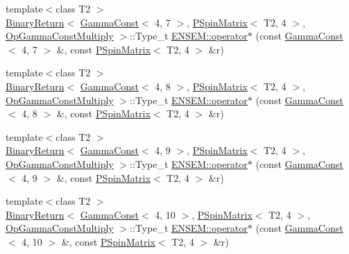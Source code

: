 \begin{DoxyCompactItemize}
\item 
{\footnotesize template$<$class T2 $>$ }\\\mbox{\hyperlink{structENSEM_1_1BinaryReturn}{Binary\+Return}}$<$ \mbox{\hyperlink{classENSEM_1_1GammaConst}{Gamma\+Const}}$<$ 4, 7 $>$, \mbox{\hyperlink{classENSEM_1_1PSpinMatrix}{P\+Spin\+Matrix}}$<$ T2, 4 $>$, \mbox{\hyperlink{structENSEM_1_1OpGammaConstMultiply}{Op\+Gamma\+Const\+Multiply}} $>$\+::Type\+\_\+t \mbox{\hyperlink{group__primspinmatrix_ga05f36a58daa404d7245006a9dd7323bb}{E\+N\+S\+E\+M\+::operator$\ast$}} (const \mbox{\hyperlink{classENSEM_1_1GammaConst}{Gamma\+Const}}$<$ 4, 7 $>$ \&, const \mbox{\hyperlink{classENSEM_1_1PSpinMatrix}{P\+Spin\+Matrix}}$<$ T2, 4 $>$ \&r)
\item 
{\footnotesize template$<$class T2 $>$ }\\\mbox{\hyperlink{structENSEM_1_1BinaryReturn}{Binary\+Return}}$<$ \mbox{\hyperlink{classENSEM_1_1GammaConst}{Gamma\+Const}}$<$ 4, 8 $>$, \mbox{\hyperlink{classENSEM_1_1PSpinMatrix}{P\+Spin\+Matrix}}$<$ T2, 4 $>$, \mbox{\hyperlink{structENSEM_1_1OpGammaConstMultiply}{Op\+Gamma\+Const\+Multiply}} $>$\+::Type\+\_\+t \mbox{\hyperlink{group__primspinmatrix_ga14cbf328548b8d7ab484cf88d9190adf}{E\+N\+S\+E\+M\+::operator$\ast$}} (const \mbox{\hyperlink{classENSEM_1_1GammaConst}{Gamma\+Const}}$<$ 4, 8 $>$ \&, const \mbox{\hyperlink{classENSEM_1_1PSpinMatrix}{P\+Spin\+Matrix}}$<$ T2, 4 $>$ \&r)
\item 
{\footnotesize template$<$class T2 $>$ }\\\mbox{\hyperlink{structENSEM_1_1BinaryReturn}{Binary\+Return}}$<$ \mbox{\hyperlink{classENSEM_1_1GammaConst}{Gamma\+Const}}$<$ 4, 9 $>$, \mbox{\hyperlink{classENSEM_1_1PSpinMatrix}{P\+Spin\+Matrix}}$<$ T2, 4 $>$, \mbox{\hyperlink{structENSEM_1_1OpGammaConstMultiply}{Op\+Gamma\+Const\+Multiply}} $>$\+::Type\+\_\+t \mbox{\hyperlink{group__primspinmatrix_gaa9f2a3db77b04450fdbceeca87443364}{E\+N\+S\+E\+M\+::operator$\ast$}} (const \mbox{\hyperlink{classENSEM_1_1GammaConst}{Gamma\+Const}}$<$ 4, 9 $>$ \&, const \mbox{\hyperlink{classENSEM_1_1PSpinMatrix}{P\+Spin\+Matrix}}$<$ T2, 4 $>$ \&r)
\item 
{\footnotesize template$<$class T2 $>$ }\\\mbox{\hyperlink{structENSEM_1_1BinaryReturn}{Binary\+Return}}$<$ \mbox{\hyperlink{classENSEM_1_1GammaConst}{Gamma\+Const}}$<$ 4, 10 $>$, \mbox{\hyperlink{classENSEM_1_1PSpinMatrix}{P\+Spin\+Matrix}}$<$ T2, 4 $>$, \mbox{\hyperlink{structENSEM_1_1OpGammaConstMultiply}{Op\+Gamma\+Const\+Multiply}} $>$\+::Type\+\_\+t \mbox{\hyperlink{group__primspinmatrix_ga6ad402d90ca05be34ec137e28d99fded}{E\+N\+S\+E\+M\+::operator$\ast$}} (const \mbox{\hyperlink{classENSEM_1_1GammaConst}{Gamma\+Const}}$<$ 4, 10 $>$ \&, const \mbox{\hyperlink{classENSEM_1_1PSpinMatrix}{P\+Spin\+Matrix}}$<$ T2, 4 $>$ \&r)

\end{DoxyCompactItemize}
